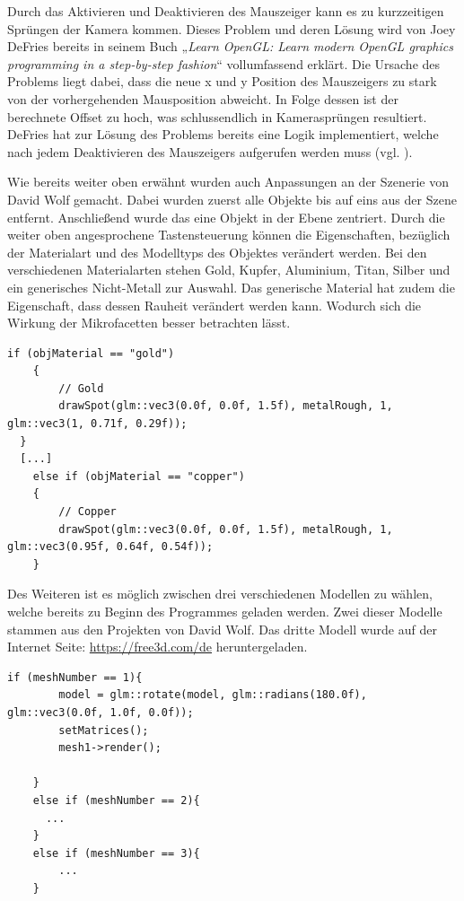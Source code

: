 \documentclass[
  11pt,
  a4paper,
  oneside
  ]{article}
\begin{document}
Durch das Aktivieren und Deaktivieren des Mauszeiger kann es zu kurzzeitigen Sprüngen der Kamera kommen. Dieses Problem und deren Lösung wird von Joey DeFries bereits in seinem Buch „\textit{Learn OpenGL: Learn modern OpenGL graphics programming in a step-by-step fashion}“ \cite{learnOpenGL} vollumfassend erklärt. Die Ursache des Problems liegt dabei, dass die neue x und y Position des Mauszeigers zu stark von der vorhergehenden Mausposition abweicht. In Folge dessen ist der berechnete Offset zu hoch, was schlussendlich in Kamerasprüngen resultiert. DeFries hat zur Lösung des Problems bereits eine Logik implementiert, welche nach jedem Deaktivieren des Mauszeigers aufgerufen werden muss (vgl. \cite{defriesKamera}).

Wie bereits weiter oben erwähnt wurden auch Anpassungen an der Szenerie von David Wolf gemacht. Dabei wurden zuerst alle Objekte bis auf eins aus der Szene entfernt. Anschließend wurde das eine Objekt in der Ebene zentriert. Durch die weiter oben angesprochene Tastensteuerung können die Eigenschaften, bezüglich der Materialart und des Modelltyps des Objektes verändert werden. Bei den verschiedenen Materialarten stehen Gold, Kupfer, Aluminium, Titan, Silber und ein generisches Nicht-Metall zur Auswahl. Das generische Material hat zudem die Eigenschaft, dass dessen Rauheit verändert werden kann. Wodurch sich die Wirkung der Mikrofacetten besser betrachten lässt. 
\begin{lstlisting}[tabsize=2]
  if (objMaterial == "gold")
	{
		// Gold
		drawSpot(glm::vec3(0.0f, 0.0f, 1.5f), metalRough, 1, glm::vec3(1, 0.71f, 0.29f));
  }
  [...]  
	else if (objMaterial == "copper")
	{
		// Copper
		drawSpot(glm::vec3(0.0f, 0.0f, 1.5f), metalRough, 1, glm::vec3(0.95f, 0.64f, 0.54f));
	}
\end{lstlisting}

Des Weiteren ist es möglich zwischen drei verschiedenen Modellen zu wählen, welche bereits zu Beginn des Programmes geladen werden. Zwei dieser Modelle stammen aus den Projekten von David Wolf. Das dritte Modell wurde auf der Internet Seite: \url{https://free3d.com/de} heruntergeladen. 
\begin{lstlisting}[tabsize=2]
  if (meshNumber == 1){
		model = glm::rotate(model, glm::radians(180.0f), glm::vec3(0.0f, 1.0f, 0.0f));
		setMatrices();
		mesh1->render();

	}
	else if (meshNumber == 2){
	  ...
	}
	else if (meshNumber == 3){
		...
	}
\end{lstlisting}
\end{document}
